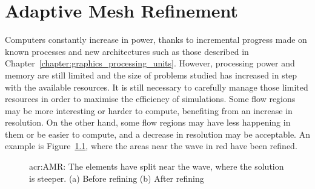 \chapter{Adaptive Mesh Refinement}\label{chapter:adaptive_mesh_refinement} 

Computers constantly increase in power, thanks to incremental progress made on known processes and
new architectures such as those described in Chapter~\ref{chapter:graphics_processing_units}.
However, processing power and memory are still limited and the size of problems studied has
increased in step with the available resources. It is still necessary to carefully manage those
limited resources in order to maximise the efficiency of simulations. Some flow regions may be more
interesting or harder to compute, benefiting from an increase in resolution. On the other hand, some
flow regions may have less happening in them or be easier to compute, and a decrease in resolution
may be acceptable. An example is Figure~\ref{fig:mesh_refinement}, where the areas near the wave in
red have been refined.

\begin{figure}[H]
    \centering
    \hfill
    \caption{\Acrlong{acr:AMR}: The elements have split near the wave, where the solution is steeper. (a) Before refining (b) After refining}\label{fig:mesh_refinement}
\end{figure}

